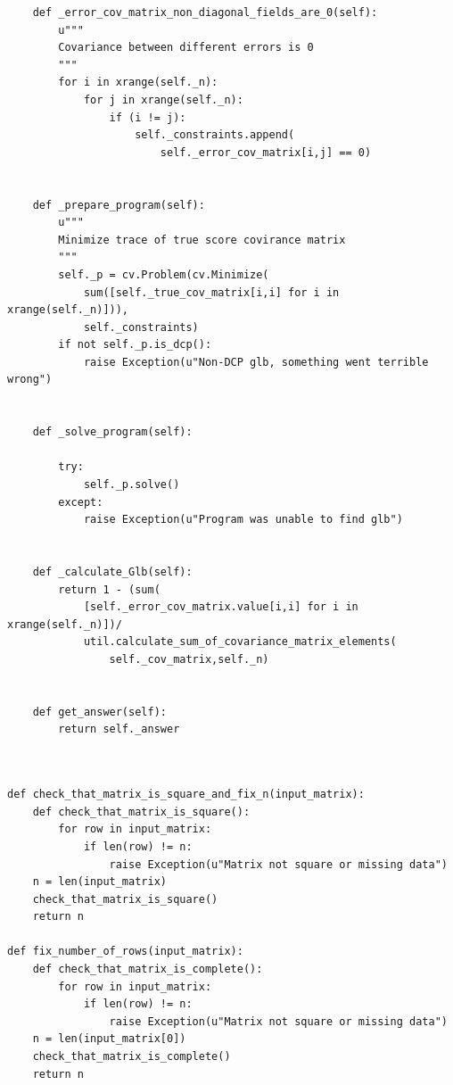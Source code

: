 \documentclass[a4paper,12pt,oneside]{article}
\newenvironment{customFloatWrap}{}{}
\numberwithin{equation}{section}
\theoremstyle{definition}
\begin{document}
\begin{subappendices}
\begin{customFloatWrap}
\begin{verbatim}
    def _error_cov_matrix_non_diagonal_fields_are_0(self):
        u"""
        Covariance between different errors is 0
        """
        for i in xrange(self._n):
            for j in xrange(self._n):
                if (i != j):
                    self._constraints.append(
                        self._error_cov_matrix[i,j] == 0) 

        
    def _prepare_program(self):
        u"""
        Minimize trace of true score covirance matrix
        """
        self._p = cv.Problem(cv.Minimize(
            sum([self._true_cov_matrix[i,i] for i in xrange(self._n)])),
            self._constraints)
        if not self._p.is_dcp():
            raise Exception(u"Non-DCP glb, something went terrible wrong")
            
            
    def _solve_program(self):

        try:
            self._p.solve()
        except:
            raise Exception(u"Program was unable to find glb")
        
    
    def _calculate_Glb(self):
        return 1 - (sum(
        	[self._error_cov_matrix.value[i,i] for i in xrange(self._n)])/
            util.calculate_sum_of_covariance_matrix_elements(
                self._cov_matrix,self._n)
        

    def get_answer(self):
        return self._answer
        
\end{verbatim}
\end{customFloatWrap}

\vspace{10pt}

\begin{customFloatWrap}
\begin{verbatim}

def check_that_matrix_is_square_and_fix_n(input_matrix):      
    def check_that_matrix_is_square():   
        for row in input_matrix:
            if len(row) != n:
                raise Exception(u"Matrix not square or missing data")  
    n = len(input_matrix) 
    check_that_matrix_is_square()
    return n

def fix_number_of_rows(input_matrix):
    def check_that_matrix_is_complete():   
        for row in input_matrix:
            if len(row) != n:
                raise Exception(u"Matrix not square or missing data")
    n = len(input_matrix[0])
    check_that_matrix_is_complete()
    return n
    


\end{verbatim}
\end{customFloatWrap}
\end{subappendices}
\end{document}
